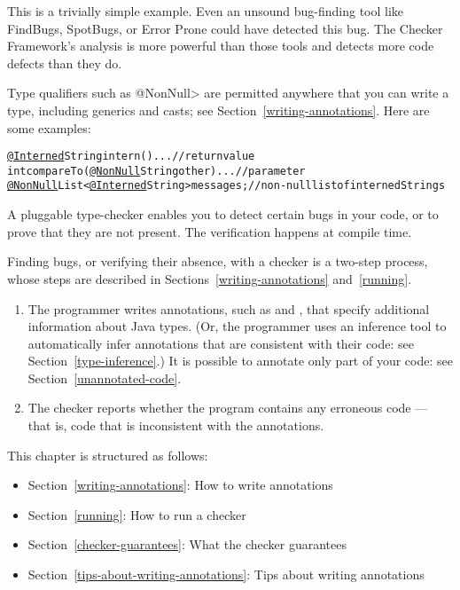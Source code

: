 This is a trivially simple example.  Even an unsound bug-finding tool like
FindBugs, SpotBugs, or Error Prone could have detected this bug.  The
Checker Framework's analysis is more powerful than those tools and detects
more code defects than they do.

Type qualifiers such as \<@NonNull> are permitted anywhere
that you can write a type, including generics and casts; see
Section~\ref{writing-annotations}.  Here are some examples:

\begin{alltt}
  \underline{@Interned} String intern() \ttlcb{} ... \ttrcb{}             // return value
  int compareTo(\underline{@NonNull} String other) \ttlcb{} ... \ttrcb{}  // parameter
  \underline{@NonNull} List<\underline{@Interned} String> messages;     // non-null list of interned Strings
\end{alltt}


\htmlhr
{}

A pluggable type-checker enables you to detect certain bugs in your code,
or to prove that they are not present.  The verification happens at compile
time.


Finding bugs, or verifying their absence, with a checker is a two-step process, whose steps are
described in Sections~\ref{writing-annotations} and~\ref{running}.

\begin{enumerate}

\item The programmer writes annotations, such as  and
  , that specify additional information about Java types.
  (Or, the programmer uses an inference tool to automatically infer
  annotations that are consistent with their code:  see Section~\ref{type-inference}.)
  It is possible to annotate only part of your code:  see
  Section~\ref{unannotated-code}.

\item The checker reports whether the program contains any erroneous code
  --- that is, code that is inconsistent with the annotations.

\end{enumerate}

This chapter is structured as follows:
\begin{itemize}
\item Section~\ref{writing-annotations}: How to write annotations
\item Section~\ref{running}:  How to run a checker
\item Section~\ref{checker-guarantees}: What the checker guarantees
\item Section~\ref{tips-about-writing-annotations}: Tips about writing annotations
\end{itemize}


